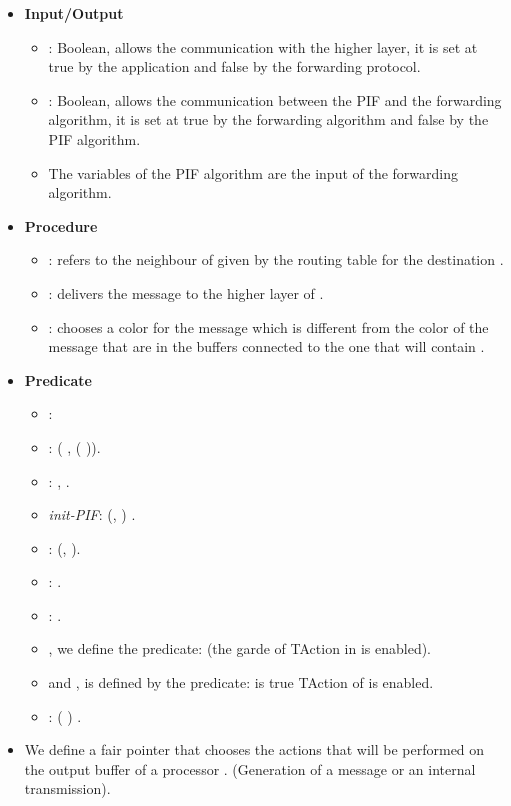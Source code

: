 \documentclass{llncs}
\begin{document}
\begin{itemize}
   \item \textbf{Input/Output}
           \begin{itemize}
            \item : Boolean, allows the communication with the higher layer, it is set at true by the application and false by the forwarding protocol.
             \item : Boolean, allows the communication between the PIF and the forwarding algorithm, it is set at true by the forwarding algorithm and false by the PIF algorithm.
             \item{The variables of the PIF algorithm are the input of the forwarding algorithm.}
            \end{itemize}

   \item \textbf{Procedure}
            \begin{itemize}
             \item : refers to the neighbour of  given by the routing table for the destination .
             \item : delivers the message  to the higher layer of . 
             \item : chooses a color for the message  which is different from the color of the message 
                   that are in the buffers connected to the one that will contain .
             \end{itemize}
             
    \item{\textbf{Predicate}}
             \begin{itemize}
              \item{\textit{}:     }
               \item{:   ( ,   (    )).}
              \item{\textit{}:   ,  .}
              \item{\textit{init-PIF}:   (, ) 
\newline \noindent .}
               \item{\textit{}:        (,   ).}
\item{:    .} 
              \item{:         .}
               \item{ , we define  the predicate:   (the garde of TAction in  is enabled).}
               \item{  and ,  is defined by the predicate:  is true  TAction of  is enabled.}
\item{:  (    )  .\\}
               \end{itemize}
               
\item{We define a fair pointer that chooses the actions that will be performed on the output buffer of a processor . (Generation of a message or an internal transmission). }


\end{itemize}
\end{document}
